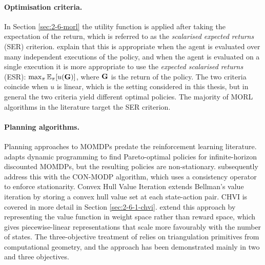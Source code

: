     \paragraph{Optimisation criteria.}
    In Section \ref{sec:2-6-morl} the utility function is applied after taking the expectation of the return, which is referred to as the \textit{scalarised expected returns} (SER) criterion. \citet{survey_mo_seq_dec_make} explain that this is appropriate when the agent is evaluated over many independent executions of the policy, and when the agent is evaluated on a single execution it is more appropriate to use the \textit{expected scalarised returns} (ESR): \mbox{$\max_\pi \mathbb{E}_\pi[u(\mathbf{G})]$}, where $\mathbf{G}$ is the return of the policy. The two criteria coincide when $u$ is linear, which is the setting considered in this thesis, but in general the two criteria yield different optimal policies.  The majority of MORL algorithms in the literature target the SER criterion. 

    \paragraph{Planning algorithms.}
    Planning approaches to MOMDPs predate the reinforcement learning literature. \citet{white_momdp} adapts dynamic programming to find Pareto-optimal policies for infinite-horizon discounted MOMDPs, but the resulting policies are non-stationary. \citet{con_modp} subsequently address this with the CON-MODP algorithm, which uses a consistency operator to enforce stationarity. Convex Hull Value Iteration \cite{chvi} extends Bellman's value iteration by storing a convex hull value set at each state-action pair. CHVI is covered in more detail in Section \ref{sec:2-6-1-chvi}. \citet{lizotte_spline_2d,lizotte_spline_nd} extend this approach by representing the value function in weight space rather than reward space, which gives piecewise-linear representations that scale more favourably with the number of states. The three-objective treatment of \citet{lizotte_spline_nd} relies on triangulation primitives from computational geometry, and the approach has been demonstrated mainly in two and three objectives.

